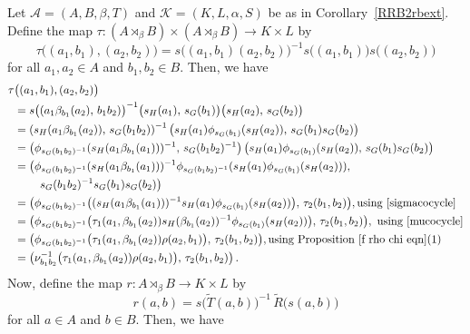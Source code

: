 \documentclass{jonasart}
\theoremstyle{plain}
\begin{document}
	Let $\mathcal{A}= (A,B, \beta, T)$ and $\mathcal{K}= (K,L,\alpha,S )$ be as in Corollary~\ref{RRB2rbext}. Define the map $\tau\colon (A\rtimes_\beta B)\times (A\rtimes_\beta B)\to K\times L$ by
	\[
	\tau \big((a_1,b_1),(a_2,b_2)\big)=s\big((a_1,b_1)(a_2,b_2)\big)^{-1}s \big((a_1,b_1)\big) s \big((a_2,b_2)\big)
	\]
	for all $a_1, a_2 \in A$ and $b_1, b_2 \in B$. Then, we have
	\begin{align}
		\tau&\big((a_1,b_1 ),(a_2,b_2 )\big) \nonumber\\
		&= s\big((a_1\beta_{b_1}(a_2 ), \,b_1 b_2 )\big)^{-1} \big(s_H (a_1 ), \,s_G (b_1 ) \big) \big(s_H (a_2 ), \,s_G (b_2 ) \big)\nonumber\\
		&= \left(s_H (a_1\beta_{b_1}(a_2)), \, s_G (b_1 b_2 )\right)^{-1} \left(s_H (a_1) \phi_{s_G (b_1)}(s_H (a_2 )), \, s_G (b_1) s_G (b_2)\right) \nonumber\\
		&= \left(\phi_{s_G (b_1 b_2)^{-1}} (s_H (a_1 \beta_{b_1}(a_1 )))^{-1}, \, s_G (b_1 b_2)^{-1} \right) \left( s_H (a_1) \phi_{s_G (b_1)} (s_H (a_2)), \, s_G (b_1) s_G (b_2)\right) \nonumber\\
		&= \left(\phi_{s_G (b_1 b_2)^{-1}} (s_H (a_1 \beta_{b_1}(a_1)))^{-1} \phi_{s_G (b_1 b_2)^{-1}} (s_H (a_1) \phi_{s_G (b_1)}(s_H (a_2))), \right. \nonumber\\
		&\qquad \left. s_G (b_1 b_2)^{-1} s_G (b_1) s_G (b_2) \right) \nonumber\\
		&=\big(\phi_{s_G (b_1 b_2 )^{-1}}\big((s_H (a_1\beta_{b_1}(a_1 )))^{-1}s_H (a_1 )\phi_{s_G (b_1 )}(s_H (a_2 ))\big), \,\tau_2 (b_1,b_2 )\big), \text{using~\eqref{sigmacocycle}}\nonumber\\
		&=\big(\phi_{s_G (b_1 b_2 )^{-1}}\big(\tau_1 (a_1,\beta_{b_1}(a_2 ))s_H (\beta_{b_1}(a_2 ))^{-1}\phi_{s_G (b_1 )}(s_H (a_2 ))\big), \,\tau_2 (b_1,b_2 )\big),~\text{using~\eqref{mucocycle}}\nonumber\\
		&=\big(\phi_{s_G (b_1 b_2 )^{-1}}\big(\tau_1 (a_1,\beta_{b_1}(a_2 ))\rho(a_2,b_1 )\big), \,\tau_2 (b_1,b_2 )\big), \text{using Proposition~\eqref{f rho chi eqn}(1)}\nonumber\\
		&=\left(\nu^{-1}_{b_1 b_2}\big(\tau_1 (a_1,\beta_{b_1}(a_2 ))\rho(a_2,b_1 )\big), \,\tau_2 (b_1,b_2 )\right). \label{tau 1 prime}
	\end{align}
	Now, define the map $r\colon A\rtimes_\beta B\to K\times L$ by
	\[
	r(a,b)=s \big(\widetilde{T}(a,b)\big)^{-1} \, \widetilde{R} \big(s(a,b)\big)
	\]
	for all $a \in A$ and $b \in B$. Then, we have
\end{document}
